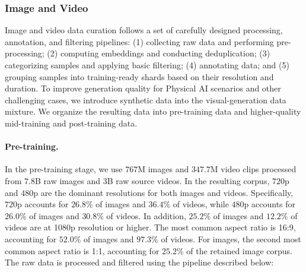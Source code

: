 \subsubsection{Image and Video}
\label{subsubsection::imagevideo}

Image and video data curation follows a set of carefully designed processing, annotation, and filtering pipelines: (1) collecting raw data and performing pre-processing; (2) computing embeddings and conducting deduplication; (3) categorizing samples and applying basic filtering; (4) annotating data; and (5) grouping samples into training-ready shards based on their resolution and duration. To improve generation quality for Physical AI scenarios and other challenging cases, we introduce synthetic data into the visual-generation data mixture. We organize the resulting data into pre-training data and higher-quality mid-training and post-training data.

\paragraph{Pre-training.}
In the pre-training stage, we use $767$M images and $347.7$M video clips processed from $7.8$B raw images and $3$B raw source videos. In the resulting corpus, $720$p and $480$p are the dominant resolutions for both images and videos. Specifically, $720$p accounts for $26.8\%$ of images and $36.4\%$ of videos, while $480$p accounts for $26.0\%$ of images and $30.8\%$ of videos. In addition, $25.2\%$ of images and $12.2\%$ of videos are at 1080p resolution or higher. The most common aspect ratio is 16:9, accounting for $52.0\%$ of images and $97.3\%$ of videos. For images, the second most common aspect ratio is 1:1, accounting for $25.2\%$ of the retained image corpus. The raw data is processed and filtered using the pipeline described below:

